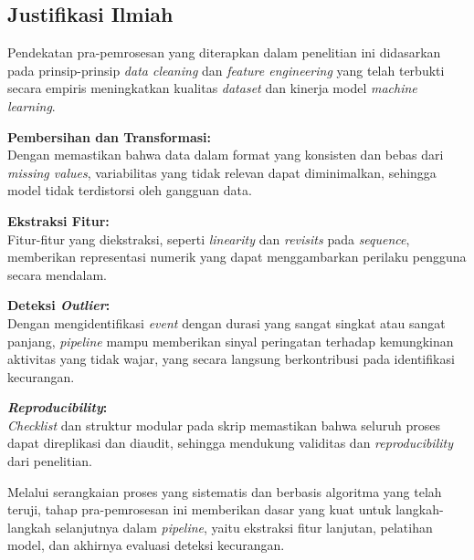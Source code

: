\subsection{Justifikasi Ilmiah}
\label{sec:justifikasiIlmiah}
Pendekatan pra-pemrosesan yang diterapkan dalam penelitian ini didasarkan pada prinsip-prinsip \textit{data cleaning} dan \textit{feature engineering} yang telah terbukti secara empiris meningkatkan kualitas \textit{dataset} dan kinerja model \textit{machine learning}.

\textbf{Pembersihan dan Transformasi:} \\
Dengan memastikan bahwa data dalam format yang konsisten dan bebas dari \textit{missing values}, variabilitas yang tidak relevan dapat diminimalkan, sehingga model tidak terdistorsi oleh gangguan data.

\textbf{Ekstraksi Fitur:} \\
Fitur-fitur yang diekstraksi, seperti \textit{linearity} dan \textit{revisits} pada \textit{sequence}, memberikan representasi numerik yang dapat menggambarkan perilaku pengguna secara mendalam.

\textbf{Deteksi \textit{Outlier}:} \\
Dengan mengidentifikasi \textit{event} dengan durasi yang sangat singkat atau sangat panjang, \textit{pipeline} mampu memberikan sinyal peringatan terhadap kemungkinan aktivitas yang tidak wajar, yang secara langsung berkontribusi pada identifikasi kecurangan.

\textbf{\textit{Reproducibility}:} \\
\textit{Checklist} dan struktur modular pada skrip memastikan bahwa seluruh proses dapat direplikasi dan diaudit, sehingga mendukung validitas dan \textit{reproducibility} dari penelitian.

Melalui serangkaian proses yang sistematis dan berbasis algoritma yang telah teruji, tahap pra-pemrosesan ini memberikan dasar yang kuat untuk langkah-langkah selanjutnya dalam \textit{pipeline}, yaitu ekstraksi fitur lanjutan, pelatihan model, dan akhirnya evaluasi deteksi kecurangan.


